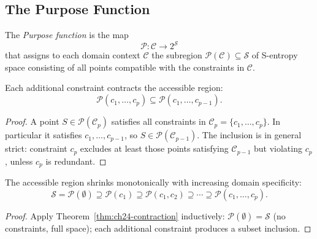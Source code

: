 \subsection{The Purpose Function}
\label{sec:ch24-purpose-func}

\begin{definition}
\label{def:ch24-purpose}
The \emph{Purpose function} is the map
\begin{equation}
\label{eq:ch24-purpose}
  \mathcal{P} : \mathcal{C} \to 2^{\mathcal{S}}
\end{equation}
that assigns to each domain context $\mathcal{C}$ the subregion
$\mathcal{P}(\mathcal{C}) \subseteq \mathcal{S}$ of S-entropy space
consisting of all points compatible with the constraints in $\mathcal{C}$.
\end{definition}

\begin{theorem}
\label{thm:ch24-contraction}
Each additional constraint contracts the accessible region:
\begin{equation}
\label{eq:ch24-contraction}
  \mathcal{P}(c_1, \ldots, c_p) \subseteq \mathcal{P}(c_1, \ldots, c_{p-1}).
\end{equation}
\end{theorem}

\begin{proof}
A point $S \in \mathcal{P}(\mathcal{C}_p)$ satisfies all constraints in
$\mathcal{C}_p = \{c_1, \ldots, c_p\}$.  In particular it satisfies
$c_1, \ldots, c_{p-1}$, so $S \in \mathcal{P}(\mathcal{C}_{p-1})$.  The
inclusion is in general strict: constraint $c_p$ excludes at least those
points satisfying $\mathcal{C}_{p-1}$ but violating $c_p$, unless $c_p$ is
redundant.
\end{proof}

\begin{corollary}
\label{cor:ch24-monotonic}
The accessible region shrinks monotonically with increasing domain specificity:
\begin{equation}
\label{eq:ch24-monotonic}
  \mathcal{S} = \mathcal{P}(\emptyset) \supseteq \mathcal{P}(c_1) \supseteq
  \mathcal{P}(c_1, c_2) \supseteq \cdots \supseteq
  \mathcal{P}(c_1, \ldots, c_p).
\end{equation}
\end{corollary}

\begin{proof}
Apply Theorem~\ref{thm:ch24-contraction} inductively:
$\mathcal{P}(\emptyset) = \mathcal{S}$ (no constraints, full space);
each additional constraint produces a subset inclusion.
\end{proof}

